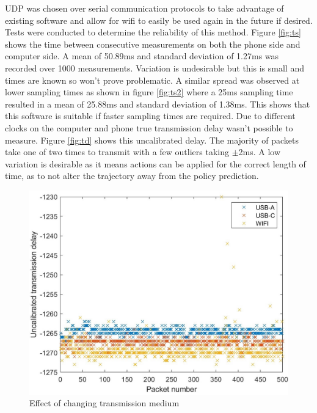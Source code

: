 \documentclass[twoside,twocolumn,12pt]{article}
\begin{document}
UDP was chosen over serial communication protocols to take advantage of existing software and allow for wifi to easily be used again in the future if desired.
\newline
Tests were conducted to determine the reliability of this method. Figure \ref{fig:ts} shows the time between consecutive measurements on both the phone side and computer side. A mean of 50.89ms and standard deviation of 1.27ms was recorded over 1000 measurements. Variation is undesirable but this is small and times are known so won't prove problematic. A similar spread was observed at lower sampling times as shown in figure \ref{fig:ts2} where a 25ms sampling time resulted in a mean of 25.88ms and standard deviation of 1.38ms. This shows that this software is suitable if faster sampling times are required.
\newline
Due to different clocks on the computer and phone true transmission delay wasn't possible to measure. Figure \ref{fig:td} shows this uncalibrated delay. The majority of packets take one of two times to transmit with a few outliers taking $\pm$2ms. A low variation is desirable as it means actions can be applied for the correct length of time, as to not alter the trajectory away from the policy prediction.


\begin{figure}
  \centering
    \includegraphics[width=\linewidth]{all3}
  \caption{Effect of changing transmission medium}
  \label{fig:med}
\end{figure}
\end{document}
